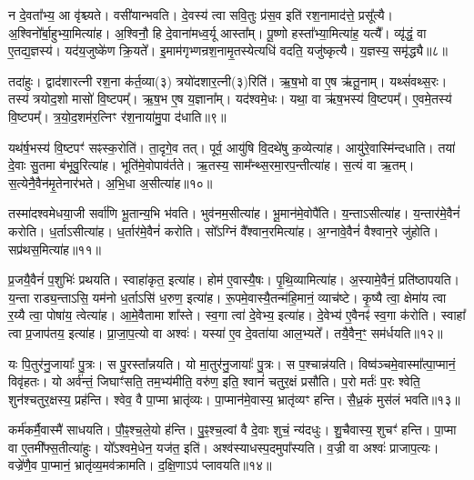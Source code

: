 न दे॒वता᳚भ्य॒ आ वृ॑श्च्यते।
वसी॑यान्भवति।
दे॒वस्य॑ त्वा सवि॒तुः प्र॑स॒व इति॑ रश॒नामाद॑त्ते॒ प्रसू᳚त्यै।
अ॒श्विनो᳚र्बा॒हुभ्या॒मित्या॑ह।
अ॒श्विनौ॒ हि दे॒वाना॑मध्व॒र्यू आस्ता᳚म्।
पू॒ष्णो हस्ता᳚भ्या॒मित्या॑ह॒ यत्यै᳚।
व्यृ॑द्धं॒ वा ए॒तद्य॒ज्ञस्य॑।
यद॑य॒जुष्के॑ण क्रि॒यते᳚।
इ॒माम॑गृभ्णन्रश॒नामृ॒तस्ये\-त्यधि॑ वदति॒ यजु॑ष्कृत्यै।
य॒ज्ञस्य॒ समृ॑द्ध्यै॥८॥\ip

तदा॑हुः।
द्वाद॑शारत्नी रश॒ना क॑र्त॒व्या(३) त्रयो॑दशार॒त्नी(३)\-रिति॑।
ऋ॒ष॒भो वा ए॒ष ऋ॑तू॒नाम्।
यथ्सं॑वथ्स॒रः।
तस्य॑ त्रयोद॒शो मासो॑ वि॒ष्टपम्᳚।
ऋ॒ष॒भ ए॒ष य॒ज्ञाना᳚म्।
यद॑श्वमे॒धः।
यथा॒ वा ऋ॑ष॒भस्य॑ वि॒ष्टपम्᳚।
ए॒वमे॒तस्य॑ वि॒ष्टपम्᳚।
त्र॒यो॒द॒शम॑र॒त्निꣳ र॑श॒नाया॑मु॒पा द॑धाति॥९॥\ip

यथ॑र्\mbox{}ष॒भस्य॑ वि॒ष्टपꣳ॑ सꣴस्क॒रोति॑।
ता॒दृगे॒व तत्।
पूर्व॒ आयु॑षि वि॒दथे॑षु क॒व्येत्या॑ह।
आयु॑रे॒वास्मि॑न्दधाति।
तया॑ दे॒वाः सु॒तमा ब॑भूवु॒रित्या॑ह।
भूति॑मे॒वोपाव॑र्तते।
ऋ॒तस्य॒ साम᳚न्थ्स॒रमा॒रप॒न्तीत्या॑ह।
स॒त्यं वा ऋ॒तम्।
स॒त्येनै॒वैन॑मृ॒तेनार॑भते।
अ॒भि॒धा अ॒सीत्या॑ह॥१०॥\ip

तस्मा॑दश्वमेधया॒जी सर्वा॑णि भू॒तान्य॒भि भ॑वति।
भुव॑नम॒सी\-त्या॑ह।
भू॒मान॑मे॒वोपै॑ति।
य॒न्ता\-ऽसीत्या॑ह।
य॒न्तार॑मे॒वैनं॑ करोति।
ध॒र्ता\-ऽसीत्या॑ह।
ध॒र्तार॑मे॒वैनं॑ करोति।
सो᳚ऽग्निं वै᳚श्वान॒रमित्या॑ह।
अ॒ग्नावे॒वैनं॑ वैश्वान॒रे जु॑होति।
सप्र॑थस॒मित्या॑ह॥११॥\ip

प्र॒जयै॒वैनं॑ प॒शुभिः॑ प्रथयति।
स्वाहा॑कृत॒ इत्या॑ह।
होम॑ ए॒वास्यै॒षः।
पृ॒थि॒व्यामित्या॑ह।
अ॒स्यामे॒वैनं॒ प्रति॑\-ष्ठापयति।
य॒न्ता राड्य॒न्ताऽसि॒ यम॑नो ध॒र्ताऽसि॑ ध॒रुण॒ इत्या॑ह।
रू॒पमे॒वास्यै॒तन्म॑हि॒मानं॒ व्याच॑ष्टे।
कृ॒ष्यै त्वा॒ क्षेमा॑य त्वा र॒य्यै त्वा॒ पोषा॑य॒ त्वेत्या॑ह।
आ॒\-मे॒वैतामा शा᳚स्ते।
स्व॒गा त्वा॑ दे॒वेभ्य॒ इत्या॑ह।
दे॒वेभ्य॑ ए॒वैनꣴ॑ स्व॒गा क॑रोति।
स्वाहा᳚ त्वा प्र॒जा\-प॑तय॒ इत्या॑ह।
प्रा॒जा॒प॒त्यो वा अश्वः॑।
यस्या॑ ए॒व दे॒वता॑या आल॒भ्यते᳚।
तयै॒वैन॒ꣳ॒ सम॑र्धयति॥१२॥\ip\anuvakamend[ब॒ध्ना॒ति॒ समृ॑द्ध्या उ॒पाद॑धात्य॒सीत्या॑ह॒ सप्र॑थस॒मित्या॑ह दे॒वेभ्य॒ इत्या॑ह॒ पञ्च॑ च]

यः पि॒तुर॑नु॒जायाः᳚ पु॒त्रः।
स पु॒रस्ता᳚न्नयति।
यो मा॒तुर॑नु॒जायाः᳚ पु॒त्रः।
स प॒श्चान्न॑यति।
विष्व॑ञ्चमे॒वास्मा᳚त्पा॒प्मानं॒ विवृ॑हतः।
यो अर्व॑न्तं॒ जिघाꣳ॑सति॒ तम॒भ्य॑मीति॒ वरु॑ण॒ इति॒ श्वानं॑ चतुर॒क्षं प्रसौ॑ति।
प॒रो मर्तः॑ प॒रः श्वेति॒ शुन॑श्चतुर॒क्षस्य॒ प्रह॑न्ति।
श्वेव॒ वै पा॒प्मा भ्रातृ॑व्यः।
पा॒प्मान॑मे॒वास्य॒ भ्रातृ॑व्यꣳ हन्ति।
सै॒ध्र॒कं मुस॑लं भवति॥१३॥\ip

कर्म॑कर्मै॒वास्मै॑ साधयति।
पौ॒ꣴ॒श्च॒ले॒यो ह॑न्ति।
पु॒ꣴ॒श्च॒ल्वां वै दे॒वाः शुचं॒ न्य॑दधुः।
शु॒चैवास्य॒ शुचꣳ॑ हन्ति।
पा॒प्मा वा ए॒तमी᳚फ्स॒तीत्या॑हुः।
यो᳚ऽश्वमे॒धेन॒ यज॑त॒ इति॑।
अश्व॑स्याधस्प॒दमु\-पा᳚स्यति।
व॒ज्री वा अश्वः॑ प्राजाप॒त्यः।
वज्रे॑णै॒व पा॒प्मानं॒ भ्रातृ॑व्य॒मव॑\-क्रामति।
द॒क्षि॒णाऽप॑ प्लावयति॥१४॥\ip

